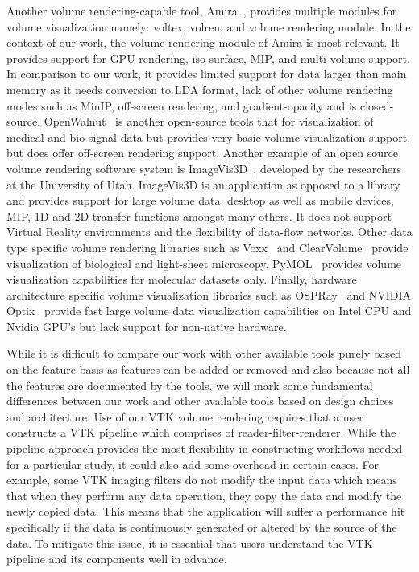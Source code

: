 Another volume rendering-capable tool, Amira~\citep{stalling2005amira}, provides
multiple modules for volume visualization namely: voltex, volren, and volume
rendering module. In the context of our work, the volume rendering module of
Amira is most relevant. It provides support for GPU rendering, iso-surface, MIP,
and multi-volume support. In comparison to our work, it provides limited support
for data larger than main memory as it needs conversion to LDA format, lack of
other volume rendering modes such as MinIP, off-screen rendering, and
gradient-opacity and is closed-source.
OpenWalnut~\citep{eichelbaum2010openwalnut} is another open-source tools that
for visualization of medical and bio-signal data but provides very basic volume
visualization support, but does offer off-screen rendering support. Another
example of an open source volume rendering software system is
ImageVis3D~\citep{cibc_imagevis3D:_2016}, developed by the researchers at the
University of Utah. ImageVis3D is an application as opposed to a library and
provides support for large volume data, desktop as well as mobile devices, MIP,
1D and 2D transfer functions amongst many others.  It does not support Virtual
Reality environments and the flexibility of data-flow networks. Other data type
specific volume rendering libraries such as Voxx~\citep{clendenon_voxx:_2002}
and ClearVolume~\citep{royer_clearvolume:_2015} provide visualization of
biological and light-sheet microscopy.  PyMOL~\citep{schrodinger_llc_pymol_2015}
provides volume visualization capabilities for molecular datasets only. Finally,
hardware architecture specific volume visualization libraries such as
OSPRay~\citep{wald_ospray_2017} and NVIDIA\textsuperscript{\textregistered}
Optix\textsuperscript{\texttrademark}~\citep{parker_optix:_2010} provide fast
large volume data visualization capabilities on Intel CPU and Nvidia GPU's but
lack support for non-native hardware.

While it is difficult to compare our work with other available tools purely
based on the feature basis as features can be added or removed and also because
not all the features are documented by the tools, we will mark some fundamental
differences between our work and other available tools based on design choices
and architecture. Use of our VTK volume rendering requires that a user
constructs a VTK pipeline which comprises of  reader-filter-renderer. While the
pipeline approach provides the most flexibility in constructing workflows needed
for a particular study, it could also add some overhead in certain cases. For
example, some VTK imaging filters do not modify the input data which means that
when they perform any data operation, they copy the data and modify the newly
copied data. This means that the application will suffer a performance hit
specifically if the data is continuously generated or altered by the source of
the data. To mitigate this issue, it is essential that users understand the VTK
pipeline and its components well in advance.

